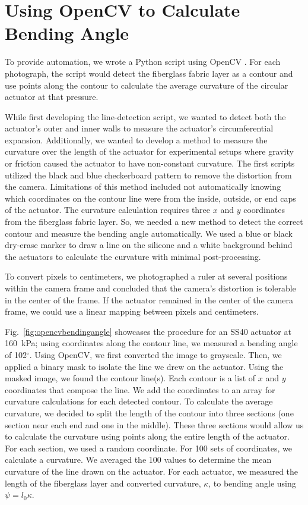 \section{Using OpenCV to Calculate Bending Angle}
\label{section:opencv}

To provide automation, we wrote a Python script using OpenCV \cite{opencv_library}. For each photograph, the script would detect the fiberglass fabric layer as a contour and use points along the contour to calculate the average curvature of the circular actuator at that pressure. 

While first developing the line-detection script, we wanted to detect both the actuator's outer and inner walls to measure the actuator's circumferential expansion. Additionally, we wanted to develop a method to measure the curvature over the length of the actuator for experimental setups where gravity or friction caused the actuator to have non-constant curvature. The first scripts utilized the black and blue checkerboard pattern to remove the distortion from the camera. Limitations of this method included not automatically knowing which coordinates on the contour line were from the inside, outside, or end caps of the actuator. The curvature calculation requires three $x$ and $y$ coordinates from the fiberglass fabric layer. So, we needed a new method to detect the correct contour and measure the bending angle automatically. We used a blue or black dry-erase marker to draw a line on the silicone and a white background behind the actuators to calculate the curvature with minimal post-processing. 

To convert pixels to centimeters, we photographed a ruler at several positions within the camera frame and concluded that the camera's distortion is tolerable in the center of the frame. If the actuator remained in the center of the camera frame, we could use a linear mapping between pixels and centimeters. 

Fig.~\ref{fig:opencvbendingangle} showcases the procedure for an SS40 actuator at 160~kPa; using coordinates along the contour line, we measured a bending angle of 102$^\circ$. Using OpenCV, we first converted the image to grayscale. Then, we applied a binary mask to isolate the line we drew on the actuator. Using the masked image, we found the contour line(s). Each contour is a list of $x$ and $y$ coordinates that compose the line. We add the coordinates to an array for curvature calculations for each detected contour. To calculate the average curvature, we decided to split the length of the contour into three sections (one section near each end and one in the middle). These three sections would allow us to calculate the curvature using points along the entire length of the actuator. For each section, we used a random coordinate. For 100 sets of coordinates, we calculate a curvature. We averaged the 100 values to determine the mean curvature of the line drawn on the actuator. For each actuator, we measured the length of the fiberglass layer and converted curvature, $\kappa$, to bending angle using $\psi=l_{0}\kappa$. \\

